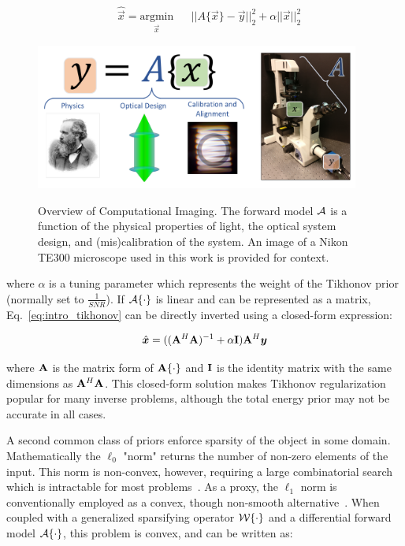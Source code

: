 \begin{equation}\label{eq:intro_tikhonov}
\begin{aligned}
& \hat{\vec{x}} = \underset{\vec{x}}{\text{argmin}}
& & ||A\{\vec{x}\}-\vec{y} ||_2^2 + \alpha||\vec{x}||_2^2
\end{aligned}
\end{equation}

\begin{figure}
    \centering
    \includegraphics[width=0.95\textwidth]{figures/fig_intro_comp_imaging.pdf}
    \label{fig:intro_overview}
    \caption{Overview of Computational Imaging. The forward model $\mathcal{A}$ is a function of the physical properties of light, the optical system design, and (mis)calibration of the system. An image of a Nikon TE300 microscope used in this work is provided for context.}
\end{figure}


\noindent where $\alpha$ is a tuning parameter which represents the weight of the Tikhonov prior (normally set to $\frac{1}{SNR}$). If $\mathcal{A}\{\cdot\}$ is linear and can be represented as a matrix, Eq.~\ref{eq:intro_tikhonov} can be directly inverted using a closed-form expression:

\begin{equation}
    \hat{\bm{x}} = ((\mathbf{A}^H \mathbf{A})^{-1} + \alpha \mathbf{I})\mathbf{A}^H \bm{y}
\end{equation}

\noindent where $\mathbf{A}$ is the matrix form of $\mathbf{A}\{\cdot\}$ and $\mathbf{I}$ is the identity matrix with the same dimensions as $\mathbf{A}^H \mathbf{A}$. This closed-form solution makes Tikhonov regularization popular for many inverse problems, although the total energy prior may not be accurate in all cases.

A second common class of priors enforce sparsity of the object in some domain. Mathematically the $\ell_0$ "norm" returns the number of non-zero elements of the input. This norm is non-convex, however, requiring a large combinatorial search which is intractable for most problems~\cite{candes2008enhancing}. As a proxy, the $\ell_1$ norm is conventionally employed as a convex, though non-smooth alternative~\cite{taylor1979deconvolution}. When coupled with a generalized sparsifying operator $\mathcal{W}\{\cdot\}$ and a differential forward model $\mathcal{A}\{\cdot\}$, this problem is convex, and can be written as:

